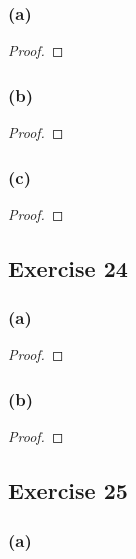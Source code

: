 \documentclass[14pt]{extarticle}
\begin{document}
\subsubsection{(a)}

\begin{proof}

\end{proof}

\subsubsection{(b)}

\begin{proof}

\end{proof}

\subsubsection{(c)}

\begin{proof}

\end{proof}

\subsection{Exercise 24}

\subsubsection{(a)}

\begin{proof}

\end{proof}

\subsubsection{(b)}

\begin{proof}

\end{proof}

\subsection{Exercise 25}

\subsubsection{(a)}
\end{document}
